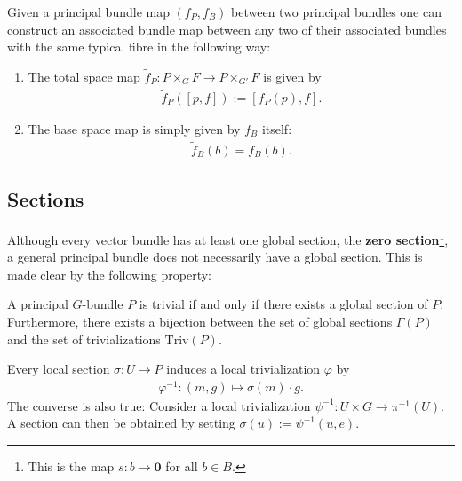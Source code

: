     \begin{construct}
        Given a principal bundle map $(f_P, f_B)$ between two principal bundles one can construct an associated bundle map between any two of their associated bundles with the same typical fibre in the following way:
        \begin{enumerate}
            \item The total space map $\widetilde{f}_P:P\times_G F\rightarrow P\times_{G'} F$ is given by
                \begin{gather}
                    \widetilde{f}_P([p, f]) := [f_P(p), f].
                \end{gather}
            \item The base space map is simply given by $f_B$ itself:
                \begin{gather}
                    \widetilde{f}_B(b) = f_B(b).
                \end{gather}
        \end{enumerate}
    \end{construct}

\subsection{Sections}

    Although every vector bundle has at least one global section, the \textbf{zero section}\footnote{This is the map $s:b\rightarrow\mathbf{0}$ for all $b\in B$.}, a general principal bundle does not necessarily have a global section. This is made clear by the following property:
    \begin{property}
        A principal $G$-bundle $P$ is trivial if and only if there exists a global section of $P$. Furthermore, there exists a bijection between the set of global sections $\Gamma(P)$ and the set of trivializations $\text{Triv}(P)$.
    \end{property}

    \begin{result}\label{diff:prin_section_triv}
        Every local section $\sigma:U\rightarrow P$ induces a local trivialization $\varphi$ by
        \begin{gather}
            \varphi^{-1}:(m, g)\mapsto \sigma(m)\cdot g.
        \end{gather}
        The converse is also true: Consider a local trivialization $\psi^{-1}:U\times G\rightarrow \pi^{-1}(U)$. A section can then be obtained by setting $\sigma(u):=\psi^{-1}(u, e)$.
    \end{result}

